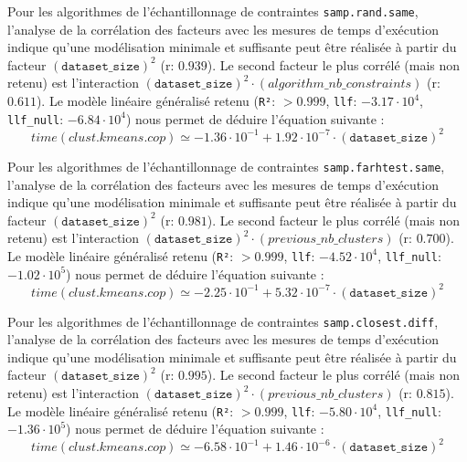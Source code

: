 			Pour les algorithmes de l'échantillonnage de contraintes \texttt{samp.rand.same}, l'analyse de la corrélation des facteurs avec les mesures de temps d'exécution indique qu'une modélisation minimale et suffisante peut être réalisée à partir du facteur $(\texttt{dataset\_size})^{2}$ (r: $0.939$).
			Le second facteur le plus corrélé (mais non retenu) est l'interaction $(\texttt{dataset\_size})^{2}\cdot(algorithm\_nb\_constraints)$ (r: $0.611$).
			Le modèle linéaire généralisé retenu (\texttt{R²}: $> 0.999$, \texttt{llf}: $-3.17\cdot10^{4}$, \texttt{llf\_null}: $-6.84\cdot10^{4}$) nous permet de déduire l'équation suivante :
			\begin{equation}
				time(clust.kmeans.cop)
				\simeq -1.36\cdot10^{-1} + 1.92\cdot10^{-7}\cdot(\texttt{dataset\_size})^{2}
			\end{equation}
			
			Pour les algorithmes de l'échantillonnage de contraintes \texttt{samp.farhtest.same}, l'analyse de la corrélation des facteurs avec les mesures de temps d'exécution indique qu'une modélisation minimale et suffisante peut être réalisée à partir du facteur $(\texttt{dataset\_size})^{2}$ (r: $0.981$).
			Le second facteur le plus corrélé (mais non retenu) est l'interaction $(\texttt{dataset\_size})^{2}\cdot(previous\_nb\_clusters)$ (r: $0.700$).
			Le modèle linéaire généralisé retenu (\texttt{R²}: $> 0.999$, \texttt{llf}: $-4.52\cdot10^{4}$, \texttt{llf\_null}: $-1.02\cdot10^{5}$) nous permet de déduire l'équation suivante :
			\begin{equation}
				time(clust.kmeans.cop)
				\simeq -2.25\cdot10^{-1} + 5.32\cdot10^{-7}\cdot(\texttt{dataset\_size})^{2}
			\end{equation}
			
			Pour les algorithmes de l'échantillonnage de contraintes \texttt{samp.closest.diff}, l'analyse de la corrélation des facteurs avec les mesures de temps d'exécution indique qu'une modélisation minimale et suffisante peut être réalisée à partir du facteur $(\texttt{dataset\_size})^{2}$ (r: $0.995$).
			Le second facteur le plus corrélé (mais non retenu) est l'interaction $(\texttt{dataset\_size})^{2}\cdot(previous\_nb\_clusters)$ (r: $0.815$).
			Le modèle linéaire généralisé retenu (\texttt{R²}: $> 0.999$, \texttt{llf}: $-5.80\cdot10^{4}$, \texttt{llf\_null}: $-1.36\cdot10^{5}$) nous permet de déduire l'équation suivante :
			\begin{equation}
				time(clust.kmeans.cop)
				\simeq -6.58\cdot10^{-1} + 1.46\cdot10^{-6}\cdot(\texttt{dataset\_size})^{2}
			\end{equation}
			

